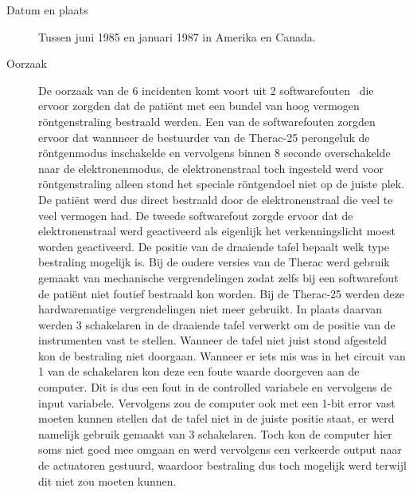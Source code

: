 \documentclass{article}
\begin{document}
\begin{description}
\item[Datum en plaats] 
Tussen juni 1985 en januari 1987 in Amerika en Canada.
\item[Oorzaak]
 De oorzaak van de 6 incidenten komt voort uit 2 softwarefouten~\cite{medicaldevices}  die ervoor zorgden dat de patiënt met een bundel van hoog vermogen röntgenstraling bestraald werden. Een van de softwarefouten zorgden ervoor dat wannneer de bestuurder van de Therac-25 perongeluk de röntgenmodus inschakelde en vervolgens binnen 8 seconde overschakelde naar de elektronenmodus, de elektronenstraal toch ingesteld werd voor röntgenstraling alleen stond het speciale röntgendoel niet op de juiste plek. De patiënt werd dus direct bestraald door de elektronenstraal die veel te veel vermogen had. De tweede softwarefout zorgde ervoor dat de elektronenstraal werd geactiveerd als eigenlijk het verkenningslicht moest worden geactiveerd. 
 De positie van de draaiende tafel bepaalt welk type bestraling mogelijk is. Bij de oudere versies van de Therac werd gebruik gemaakt van mechanische vergrendelingen zodat zelfs bij een softwarefout de patiënt niet foutief bestraald kon worden. Bij de Therac-25 werden deze hardwarematige vergrendelingen niet meer gebruikt. In plaats daarvan werden 3 schakelaren in de draaiende tafel verwerkt om de positie van de instrumenten vast te stellen. Wanneer de tafel niet juist stond afgesteld kon de bestraling niet doorgaan. Wanneer er iets mis was in het circuit van 1 van de schakelaren kon deze een foute waarde doorgeven aan de computer. Dit is dus een fout in de controlled variabele en vervolgens de input variabele. Vervolgens zou de computer ook met een 1-bit error vast moeten kunnen stellen dat de tafel niet in de juiste positie staat, er werd namelijk gebruik gemaakt van 3 schakelaren. Toch kon de computer hier soms niet goed mee omgaan en werd vervolgens een verkeerde output naar de actuatoren gestuurd, waardoor bestraling dus toch mogelijk werd terwijl dit niet zou moeten kunnen.
\end{description}
\end{document}
